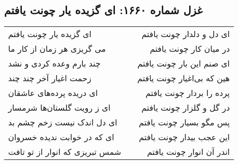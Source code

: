 \begin{center}
\section*{غزل شماره ۱۶۶۰: ای گزیده یار چونت یافتم}
\label{sec:1660}
\begin{longtable}{l p{0.5cm} r}
ای گزیده یار چونت یافتم
&&
ای دل و دلدار چونت یافتم
\\
می گریزی هر زمان از کار ما
&&
در میان کار چونت یافتم
\\
چند بارم وعده کردی و نشد
&&
ای صنم این بار چونت یافتم
\\
زحمت اغیار آخر چند چند
&&
هین که بی‌اغیار چونت یافتم
\\
ای دریده پرده‌های عاشقان
&&
پرده را بردار چونت یافتم
\\
ای ز رویت گلستان‌ها شرمسار
&&
در گل و گلزار چونت یافتم
\\
ای دل اندک نیست زخم چشم بد
&&
پس مگو بسیار چونت یافتم
\\
ای که در خوابت ندیده خسروان
&&
این عجب بیدار چونت یافتم
\\
شمس تبریزی که انوار از تو تافت
&&
اندر آن انوار چونت یافتم
\\
\end{longtable}
\end{center}
